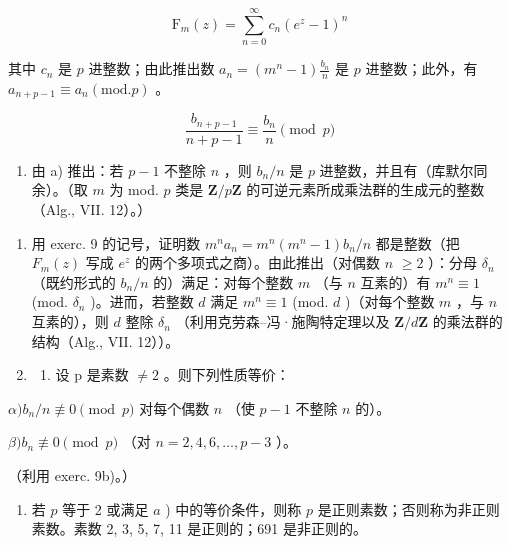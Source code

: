 \[
\mathrm{F} _ {m} (z) = \sum_ {n = 0} ^ {\infty} c _ {n} (e ^ {z} - 1) ^ {n}
\]

其中 \(c_{n}\) 是 \(p\) 进整数；由此推出数 \(a_{n} = (m^{n} - 1)\frac{b_{n}}{n}\) 是 \(p\) 进整数；此外，有 \(a_{n + p - 1} \equiv a_{n} (\mathrm{mod.} p)\) 。

\[
\frac {b _ {n + p - 1}}{n + p - 1} \equiv \frac {b _ {n}}{n} \pmod {p}
\]

\begin{enumerate}
\def\labelenumi{\alph{enumi})}
\setcounter{enumi}{1}
\tightlist
\item
  由 a) 推出：若 \(p - 1\) 不整除 \(n\) ，则 \(b_{n} / n\) 是 \(p\) 进整数，并且有（库默尔同余）。（取 \(m\) 为 mod. \(p\) 类是 \(\mathbf{Z} / p\mathbf{Z}\) 的可逆元素所成乘法群的生成元的整数（Alg., VII. 12）。）
\end{enumerate}

\begin{enumerate}
\def\labelenumi{\arabic{enumi})}
\setcounter{enumi}{9}
\item
  用 exerc. 9 的记号，证明数 \(m^n a_n = m^n (m^n - 1)b_n / n\) 都是整数（把 \(F_m(z)\) 写成 \(e^z\) 的两个多项式之商）。由此推出（对偶数 \(n\) \(\geqslant 2\) ）：分母 \(\delta_n\) （既约形式的 \(b_n / n\) 的）满足：对每个整数 \(m\) （与 \(n\) 互素的）有 \(m^n \equiv 1\) (mod. \(\delta_n\) )。进而，若整数 \(d\) 满足 \(m^n \equiv 1\) (mod. \(d\) )（对每个整数 \(m\) ，与 \(n\) 互素的），则 \(d\) 整除 \(\delta_n\) （利用克劳森–冯·施陶特定理以及 \(\mathbf{Z} / d\mathbf{Z}\) 的乘法群的结构（Alg., VII. 12））。
\item
  \begin{enumerate}
  \def\labelenumii{\alph{enumii})}
  \tightlist
  \item
    设 p 是素数 \(\neq 2\) 。则下列性质等价：
  \end{enumerate}
\end{enumerate}

\(\alpha) b_n / n \not\equiv 0 \pmod{p}\) 对每个偶数 \(n\) （使 \(p - 1\) 不整除 \(n\) 的）。

\(\beta) b_n \not\equiv 0 \pmod{p}\) （对 \(n = 2, 4, 6, \ldots, p - 3\) ）。

（利用 exerc. 9b)。）

\begin{enumerate}
\def\labelenumi{\alph{enumi})}
\setcounter{enumi}{1}
\tightlist
\item
  若 \(p\) 等于 2 或满足 \(a\) ) 中的等价条件，则称 \(p\) 是正则素数；否则称为非正则素数。素数 2, 3, 5, 7, 11 是正则的；691 是非正则的。
\end{enumerate}

